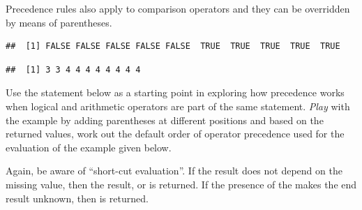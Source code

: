 \documentclass[krantz2]{krantz}\usepackage{knitr}
\begin{document}
Precedence rules also apply to comparison operators and they can be overridden by means of parentheses.

\begin{knitrout}\footnotesize
{}\color{fgcolor}\begin{kframe}
\begin{alltt}
 \hlopt{>}  \hlopt{+} 
\end{alltt}
\begin{verbatim}
##  [1] FALSE FALSE FALSE FALSE FALSE  TRUE  TRUE  TRUE  TRUE  TRUE
\end{verbatim}
\begin{alltt}
 \hlopt{>} \hlstd{)} \hlopt{+} 
\end{alltt}
\begin{verbatim}
##  [1] 3 3 4 4 4 4 4 4 4 4
\end{verbatim}
\end{kframe}
\end{knitrout}

\begin{playground}
Use the statement below as a starting point in exploring how precedence works when logical and arithmetic operators are part of the same statement. \emph{Play} with the example by adding parentheses at different positions and based on the returned values, work out the default order of operator precedence used for the evaluation of the example given below.

\begin{knitrout}\footnotesize
{}\color{fgcolor}\begin{kframe}
\begin{alltt}
 \hlkwb{<-} \hlopt{:}
 \hlopt{>}  \hlopt{|}  \hlopt{+}  \hlopt{<} 
\end{alltt}
\end{kframe}
\end{knitrout}
\end{playground}

Again, be aware of ``short-cut evaluation''. If the result does not depend on the missing value, then the result,  or  is returned. If the presence of the  makes the end result unknown, then  is returned.
\end{document}
